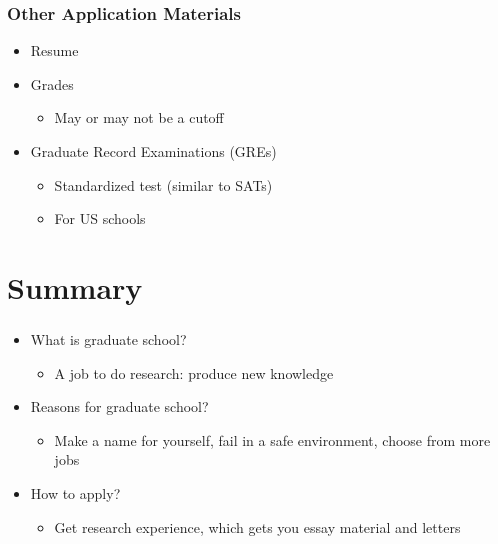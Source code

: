 \documentclass{beamer}
\begin{document}
\begin{frame}
  \frametitle{Other Application Materials}
  \begin{itemize}
    \item Resume
    \item Grades
      \begin{itemize}
        \item May or may not be a cutoff
      \end{itemize}
    \item Graduate Record Examinations (GREs)
      \begin{itemize}
        \item Standardized test (similar to SATs)
        \item For US schools
      \end{itemize}
  \end{itemize}
\end{frame}

\section{Summary}
\begin{frame}
  \frametitle{\insertsection}
  \begin{itemize}
    \item What is graduate school?
      \begin{itemize}
        \item A job to do research: produce new knowledge
      \end{itemize}
    \item Reasons for graduate school?
      \begin{itemize}
        \item Make a name for yourself, fail in a safe environment, choose from
          more jobs
      \end{itemize}
    \item How to apply?
      \begin{itemize}
        \item Get research experience, which gets you essay material and letters
      \end{itemize}
  \end{itemize}
\end{frame}
\end{document}
